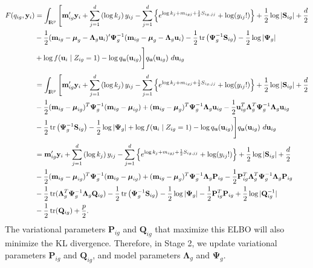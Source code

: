 \documentclass[12pt]{article}
\newcommand{\real}{\text{\rm I\hspace{-0.6mm}R}}
\newcommand{\bP}{\mathbf{P}}
\newcommand{\bQ}{\mathbf{Q}}
\newcommand{\bS}{\mathbf{S}}
\newcommand{\bmm}{\mathbf{m}}
\newcommand{\bu}{\mathbf{u}}
\newcommand{\by}{\mathbf{y}}
\newcommand{\bmu}{\boldsymbol{\mu}}
\newcommand{\bLambda}{\boldsymbol{\Lambda}}
\newcommand{\bPsi}{\boldsymbol{\Psi}}
\newcommand{\tr}{\,\mbox{tr}}
\begin{document}
\begin{align*}
F(q_{ig},\by_i)&=\int_{\real^p} \Bigg[\bmm_{ig}'\by_i + \sum_{j=1}^d\left(\log k_j\right)y_{ij}-   \sum_{j=1}^d \left\{e^{\log k_j+m_{igj}+\frac{1}{2}S_{ig,jj}}+\log(y_{ij}!)\right\} +\frac{1}{2} \log |\bS_{ig}| +\frac{d}{2}\\
&-\frac{1}{2}(\bmm_{ig}-\bmu_g-\bLambda_g\bu_i)'\bPsi_g^{-1}(\bmm_{ig}-\bmu_g-\bLambda_g\bu_i)-\frac{1}{2}\tr\left(\bPsi_g^{-1}\mathbf{S}_{ig}\right)  -\frac{1}{2} \log |\bPsi_g| \\
&+ \log f(\bu_i\mid Z_{ig}=1)  - \log q_{\bu}(\bu_{ig}) \Bigg] q_{\bu}(\bu_{ig}) ~d\bu_{ig}\\[3pt]
&=\int_{\real^p} \Bigg[\bmm_{ig}'\by_i + \sum_{j=1}^d\left(\log k_j\right)y_{ij}-   \sum_{j=1}^d \left\{e^{\log k_j+m_{igj}+\frac{1}{2}S_{ig,jj}}+\log(y_{ij}!)\right\} +\frac{1}{2} \log |\bS_{ig}| +\frac{d}{2}\\
&-\frac{1}{2}(\bmm_{ig}-\bmu_{ig})^T\bPsi_g^{-1}(\bmm_{ig}-\bmu_{ig})+(\bmm_{ig}-\bmu_g)^T\bPsi_g^{-1}\bLambda_g\bu_{ig}-\frac{1}{2}\bu_{ig}^T\bLambda_g^T\bPsi_g^{-1}\bLambda_g\bu_{ig}\\
&-\frac{1}{2}\tr\left(\bPsi_g^{-1}\mathbf{S}_{ig}\right)  -\frac{1}{2} \log |\bPsi_g|+ \log f(\bu_i\mid Z_{ig}=1)  - \log q_{\bu}(\bu_{ig}) \Bigg] q_{\bu}(\bu_{ig}) ~d\bu_{ig}\\[3pt]
&=\bmm_{ig}'\by_i + \sum_{j=1}^d\left(\log k_j\right)y_{ij}-   \sum_{j=1}^d \left\{e^{\log k_j+m_{igj}+\frac{1}{2}S_{ig,jj}}+\log(y_{ij}!)\right\} +\frac{1}{2} \log |\bS_{ig}| +\frac{d}{2}\\
&-\frac{1}{2}(\bmm_{ig}-\bmu_{ig})^T\bPsi_g^{-1}(\bmm_{ig}-\bmu_{ig})+(\bmm_{ig}-\bmu_g)^T\bPsi_g^{-1}\bLambda_g\bP_{ig}-\frac{1}{2}\bP_{ig}^T\bLambda_g^T\bPsi_g^{-1}\bLambda_g\bP_{ig}\\
&-\frac{1}{2}\tr(\bLambda_g^T\bPsi_g^{-1}\bLambda_g\bQ_{ig})-\frac{1}{2}\tr\left(\bPsi_g^{-1}\mathbf{S}_{ig}\right)  -\frac{1}{2} \log |\bPsi_g|-\frac{1}{2}\bP_{ig}^T\bP_{ig}+\frac{1}{2}\log | \bQ_{ig}^{-1}|\\
&-\frac{1}{2}\tr( \bQ_{ig}) + \frac{p}{2}.
\end{align*}
The variational parameters $\bP_{ig}$ and $\bQ_{ig}$ that maximize this ELBO will also minimize the KL divergence.
Therefore, in Stage 2, we update variational parameters $\bP_{ig}$ and $\bQ_{ig}$, and model parameters $\bLambda_g$ and $\bPsi_g$.
\end{document}
